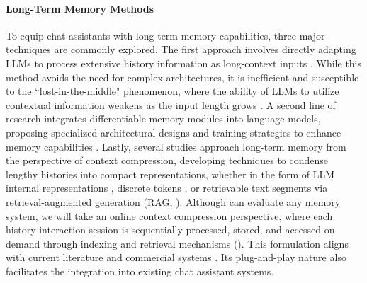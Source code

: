 \paragraph{Long-Term Memory Methods} To equip chat assistants with long-term memory capabilities, three major techniques are commonly explored. The first approach involves directly adapting LLMs to process extensive history information as long-context inputs \citep{Beltagy2020Longformer,kitaev2020reformer,DBLP:conf/icml/FuPNYHK024,DBLP:journals/corr/abs-2404-16811}. While this method avoids the need for complex architectures, it is inefficient and susceptible to the ``lost-in-the-middle" phenomenon, where the ability of LLMs to utilize contextual information weakens as the input length grows \citep{DBLP:conf/icml/ShiCMSDCSZ23, DBLP:journals/tacl/LiuLHPBPL24}. A second line of research integrates differentiable memory modules into language models, proposing specialized architectural designs and training strategies to enhance memory capabilities \citep{weston2014memory, wu2022memorizing, zhong-etal-2022-training, DBLP:conf/nips/Wang0CLYGW23}. Lastly, several studies approach long-term memory from the perspective of context compression, developing techniques to condense lengthy histories into compact representations, whether in the form of LLM internal representations \citep{DBLP:conf/nips/Mu0G23, DBLP:conf/emnlp/ChevalierWAC23}, discrete tokens \citep{DBLP:conf/emnlp/JiangWLYQ23, DBLP:conf/iclr/XuSC24}, or retrievable text segments via retrieval-augmented generation (RAG, \citet{shi-etal-2024-replug, DBLP:conf/nips/Wang0CLYGW23, DBLP:conf/iclr/SarthiATKGM24, DBLP:journals/corr/abs-2310-05029, DBLP:journals/corr/abs-2405-14831}). Although \BENCHMARK{} can evaluate any memory system, we will take an online context compression perspective, where each history interaction session is sequentially processed, stored, and accessed on-demand through indexing and retrieval mechanisms (). This formulation aligns with current literature \citep{zhong2024memorybank,DBLP:journals/corr/abs-2405-14831} and commercial systems \citep{openai_memory_2024, coze_memory_2024}. Its plug-and-play nature also facilitates the integration into existing chat assistant systems. 

